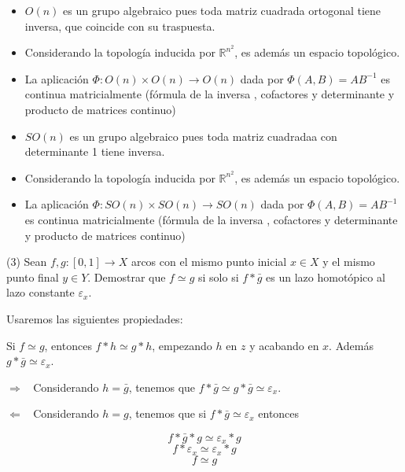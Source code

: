 \documentclass[
  a4paper,
  spanish,
  12pt,
]{scrartcl}
\begin{document}
\begin{sol}
\begin{itemize}
\item{$O(n)$ es un grupo algebraico pues toda matriz cuadrada ortogonal tiene inversa, que coincide con su traspuesta.}
\item{Considerando la topología inducida por $\mathbb{R}^{n^2}$, es además un espacio topológico.}
\item{La aplicación $\Phi: O(n) \times O(n) \rightarrow O(n)$ dada por $\Phi(A, B) = AB^{-1}$
es continua matricialmente (fórmula de la inversa , cofactores y determinante y producto de matrices continuo)}
\end{itemize}

\begin{itemize}
\item{$SO(n)$ es un grupo algebraico pues toda matriz cuadradaa con determinante 1 tiene inversa.}
\item{Considerando la topología inducida por $\mathbb{R}^{n^2}$, es además un espacio topológico.}
\item{La aplicación $\Phi: SO(n) \times SO(n) \rightarrow SO(n)$ dada por $\Phi(A, B) = AB^{-1}$
es continua matricialmente (fórmula de la inversa , cofactores y determinante y producto de matrices continuo)}
\end{itemize}

\end{sol}

\begin{ejer}
(3) Sean $f, g:[0,1] \rightarrow X$ arcos con el mismo punto inicial $x \in X$ y el mismo punto final $y \in Y$. Demostrar que $f \simeq g$ si solo si $f * \bar{g}$ es un lazo homotópico al lazo constante $\varepsilon_{x}$.\\
\end{ejer}


\begin{sol}

Usaremos las siguientes propiedades:

Si $f \simeq g$, entonces $f*h \simeq g*h$, empezando $h$ en $z$ y acabando en $x$. 
Además $g * \bar{g} \simeq \varepsilon_x$.

\newpage 

$\boxed{\Rightarrow}\;\;$ Considerando $h = \bar{g}$, tenemos que $f*\bar{g} \simeq g * \bar{g} \simeq \varepsilon_x$. 

$\boxed{\Leftarrow}\;\;$ Considerando $h = g$, tenemos que si $f * \bar{g} \simeq \varepsilon_x $ entonces 

$$f * \bar{g} * g \simeq \varepsilon_x * g$$
$$f * \varepsilon_x \simeq \varepsilon_x * g$$
$$f \simeq g$$


\end{sol}
\end{document}
